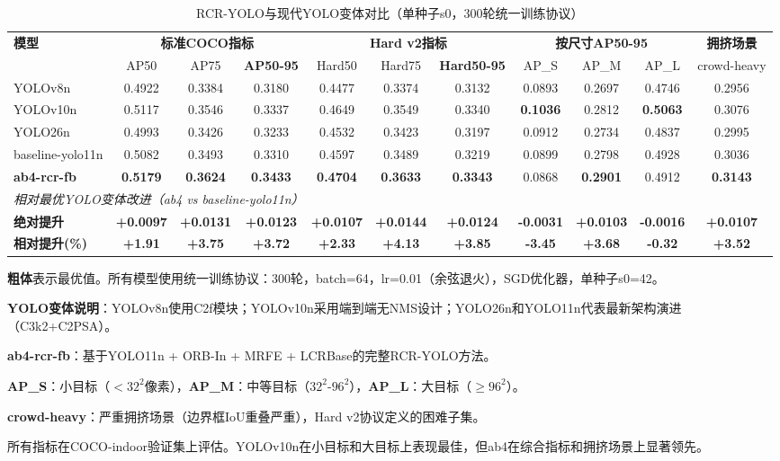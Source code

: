 
\begin{table}[t]
\centering
\caption{RCR-YOLO与现代YOLO变体对比（单种子s0，300轮统一训练协议）}
\label{tab:yolo_comparison}
\begin{tabular}{l|ccc|ccc|ccc|c}
\hline
\multirow{2}{*}{\textbf{模型}} & \multicolumn{3}{c|}{\textbf{标准COCO指标}} & \multicolumn{3}{c|}{\textbf{Hard v2指标}} & \multicolumn{3}{c|}{\textbf{按尺寸AP50-95}} & \textbf{拥挤场景} \\
& AP50 & AP75 & \textbf{AP50-95} & Hard50 & Hard75 & \textbf{Hard50-95} & AP\_S & AP\_M & AP\_L & crowd-heavy \\
\hline
\hline
YOLOv8n & 0.4922 & 0.3384 & 0.3180 & 0.4477 & 0.3374 & 0.3132 & 0.0893 & 0.2697 & 0.4746 & 0.2956 \\
YOLOv10n & 0.5117 & 0.3546 & 0.3337 & 0.4649 & 0.3549 & 0.3340 & \textbf{0.1036} & 0.2812 & \textbf{0.5063} & 0.3076 \\
YOLO26n & 0.4993 & 0.3426 & 0.3233 & 0.4532 & 0.3423 & 0.3197 & 0.0912 & 0.2734 & 0.4837 & 0.2995 \\
baseline-yolo11n & 0.5082 & 0.3493 & 0.3310 & 0.4597 & 0.3489 & 0.3219 & 0.0899 & 0.2798 & 0.4928 & 0.3036 \\
\hline
\textbf{ab4-rcr-fb} & \textbf{0.5179} & \textbf{0.3624} & \textbf{0.3433} & \textbf{0.4704} & \textbf{0.3633} & \textbf{0.3343} & 0.0868 & \textbf{0.2901} & 0.4912 & \textbf{0.3143} \\
\hline
\hline
\multicolumn{11}{l}{\textit{相对最优YOLO变体改进（ab4 vs baseline-yolo11n）}} \\
\textbf{绝对提升} & \textbf{+0.0097} & \textbf{+0.0131} & \textbf{+0.0123} & \textbf{+0.0107} & \textbf{+0.0144} & \textbf{+0.0124} & \textbf{-0.0031} & \textbf{+0.0103} & \textbf{-0.0016} & \textbf{+0.0107} \\
\textbf{相对提升(\%)} & \textbf{+1.91} & \textbf{+3.75} & \textbf{+3.72} & \textbf{+2.33} & \textbf{+4.13} & \textbf{+3.85} & \textbf{-3.45} & \textbf{+3.68} & \textbf{-0.32} & \textbf{+3.52} \\
\hline
\end{tabular}
\begin{tablenotes}
\small
\item \textbf{粗体}表示最优值。所有模型使用统一训练协议：300轮，batch=64，lr=0.01（余弦退火），SGD优化器，单种子s0=42。
\item \textbf{YOLO变体说明}：YOLOv8n使用C2f模块；YOLOv10n采用端到端无NMS设计；YOLO26n和YOLO11n代表最新架构演进（C3k2+C2PSA）。
\item \textbf{ab4-rcr-fb}：基于YOLO11n + ORB-In + MRFE + LCRBase的完整RCR-YOLO方法。
\item \textbf{AP\_S}：小目标（$<32^2$像素），\textbf{AP\_M}：中等目标（$32^2$-$96^2$），\textbf{AP\_L}：大目标（$\geq 96^2$）。
\item \textbf{crowd-heavy}：严重拥挤场景（边界框IoU重叠严重），Hard v2协议定义的困难子集。
\item 所有指标在COCO-indoor验证集上评估。YOLOv10n在小目标和大目标上表现最佳，但ab4在综合指标和拥挤场景上显著领先。
\end{tablenotes}
\end{table}
